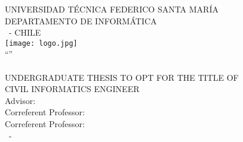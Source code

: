 \begin{titlepage}
\begin{center}
\noindent
{\fontsize{18}{22}\selectfont UNIVERSIDAD T\'ECNICA FEDERICO SANTA MAR\'IA \\}
{\fontsize{16}{19}\selectfont DEPARTAMENTO DE INFORM\'ATICA \\}
{\fontsize{16}{19}\selectfont \MakeUppercase{\city}\ - CHILE \\}
\vspace{1.5cm}
\texttt{[image: logo.jpg]} \\
\vspace{1.5cm}
{\fontsize{20}{24}\selectfont ``\MakeUppercase{\thesistitle}'' \\}
\vfill
{\fontsize{16}{19}\selectfont \MakeUppercase{\studentname} \\}
\vfill
{\fontsize{16}{19}\selectfont UNDERGRADUATE THESIS TO OPT FOR THE TITLE OF \\}
{\fontsize{16}{19}\selectfont CIVIL INFORMATICS ENGINEER \\}
\vspace{1.5cm}
{\fontsize{14}{17}\selectfont Advisor: \professorname \\}
{\fontsize{14}{17}\selectfont Correferent Professor: \fcorreferentname \\}
{\fontsize{14}{17}\selectfont Correferent Professor: \scorreferentname \\}
\vspace{2.5cm}
{\fontsize{14}{17}\selectfont \exammonth\ - \examyear \\}
\end{center}
\end{titlepage}


\newpage

\newpage

\newpage

\newpage